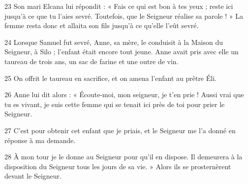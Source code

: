 
23 Son mari Elcana lui répondit : « Fais ce qui est bon à tes yeux ; reste ici jusqu’à ce que tu l’aies sevré. Toutefois, que le Seigneur réalise sa parole ! » La femme resta donc et allaita son fils jusqu’à ce qu’elle l’eût sevré.

24 Lorsque Samuel fut sevré, Anne, sa mère, le conduisit à la Maison du Seigneur, à Silo ; l’enfant était encore tout jeune. Anne avait pris avec elle un taureau de trois ans, un sac de farine et une outre de vin.

25 On offrit le taureau en sacrifice, et on amena l’enfant au prêtre Éli.

26 Anne lui dit alors : « Écoute-moi, mon seigneur, je t’en prie ! Aussi vrai que tu es vivant, je suis cette femme qui se tenait ici près de toi pour prier le Seigneur.

27 C’est pour obtenir cet enfant que je priais, et le Seigneur me l’a donné en réponse à ma demande.

28 À mon tour je le donne au Seigneur pour qu’il en dispose. Il demeurera à la disposition du Seigneur tous les jours de sa vie. » Alors ils se prosternèrent devant le Seigneur.